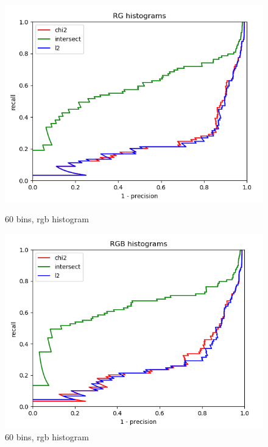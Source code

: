 \documentclass{article}
\begin{document}
\begin{figure}[ht]
    \centering
    \begin{minipage}{.5\textwidth}
        \includegraphics[width=\linewidth]{images/Q4.b-rg_histogram_60_bins.png}
        \cprotect\caption{60 bins, rgb histogram}
    \end{minipage}\hfill
    \begin{minipage}{.5\textwidth}
        \includegraphics[width=\linewidth]{images/Q4.b-rgb_histogram_60_bins.png}
        \cprotect\caption{60 bins, rgb histogram}
    \end{minipage}
        \begin{minipage}{.5\textwidth}

\end{minipage}
\end{figure}
\end{document}
